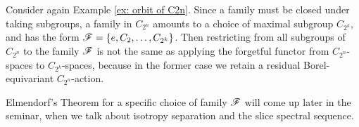 \begin{example}[Families in $C_{2^n}$]
    Consider again Example \ref{ex: orbit of C2n}. Since a family must be closed under taking subgroups, a family in $C_{2^n}$ amounts to a choice of maximal subgroup $C_{2^k}$, and has the form $\mathscr{F} = \{e, C_2, \ldots, C_{2^k}\}$. Then restricting from all subgroups of $C_{2^n}$ to the family $\mathscr{F}$ is not the same as applying the forgetful functor from $C_{2^n}$-spaces to $C_{2^k}$-spaces, because in the former case we retain a residual Borel-equivariant $C_{2^n}$-action. 
\end{example}

\begin{remark}
    Elmendorf's Theorem for a specific choice of family $\mathscr{F}$ will come up later in the seminar, when we talk about isotropy separation and the slice spectral sequence. 
\end{remark}
